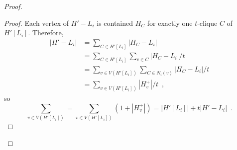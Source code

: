\documentclass[kpfonts]{patmorin}
\theoremstyle{named}
\begin{document}
\begin{proof}
    \begin{proof}
        Each vertex of $H'-L_i$ is contained $H_C$ for exactly one $t$-clique $C$ of $H'[L_i]$.  Therefore,
        \begin{align*}
            |H'-L_i|
            & = \sum_{C\in H'[L_i]} |H_C-L_i| \\
            & = \sum_{C\in H'[L_i]}\sum_{v\in C} |H_C-L_i|/t \\
            & = \sum_{v\in V(H'[L_i])}\sum_{C\in N_i(v)} |H_C-L_i|/t \\
            & = \sum_{v\in V(H'[L_i])}|H^+_v|/t \enspace ,
        \end{align*}
        so
        \[  \sum_{v\in V(H'[L_i])} = \sum_{v\in V(H'[L_i])}(1+|H^+_v|)
          = |H'[L_i]| + t|H'-L_i| \enspace .
        \]
    \end{proof}




\end{proof}
\end{document}
